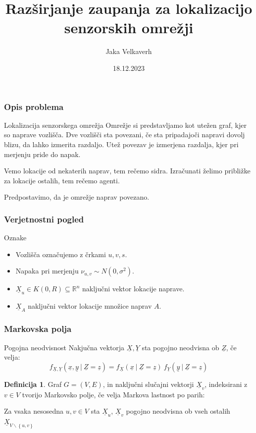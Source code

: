 \documentclass{beamer}
\title[Razširjanje zaupanja]{Razširjanje zaupanja za lokalizacijo senzorskih omrežji}
\author{Jaka Velkaverh}
\date{18.12.2023}
\theoremstyle{definition}
\newtheorem{definicija}{Definicija}
\begin{document}
	\frame{\titlepage}

	\begin{frame}
		\frametitle{Opis problema}
		\begin{block}{Lokalizacija senzorskega omrežja}
			Omrežje si predstavljamo kot utežen graf, kjer so naprave vozlišča.
			Dve vozlišči sta povezani, če sta pripadajoči napravi dovolj blizu,
			da lahko izmerita razdaljo. Utež povezav je izmerjena razdalja,
			kjer pri merjenju pride do napak.

			Vemo lokacije od nekaterih naprav, tem rečemo sidra. Izračunati
			želimo približke za lokacije ostalih, tem rečemo agenti.
		\end{block}
		Predpostavimo, da je omrežje naprav povezano.
	\end{frame}

	\begin{frame}
		\frametitle{Verjetnostni pogled}
		Oznake
		\begin{itemize}
			\item Vozlišča označujemo z črkami $u, v, s$.
			\item Napaka pri merjenju $\nu_{u, v} \sim N\left(0, \sigma^2\right)$.
			\item $\underline{X}_u \in K\left(0,R\right) \subseteq \mathbb{R}^n$ naključni vektor lokacije naprave.
			\item $\underline{X}_A$ naključni vektor lokacije množice naprav $A$.
		\end{itemize}
	\end{frame}

	\begin{frame}
		\frametitle{Markovska polja}
		\begin{block}{Pogojna neodvisnost}
			Nakjučna vektorja $\underline{X}, \underline{Y}$ sta pogojno
			neodvisna ob $\underline{Z}$, če velja:
			$$f_{\underline{X}, \underline{Y}}\left(\underline{x}, \underline{y}\ |\ \underline{Z} = \underline{z}\right) =
			  f_{\underline{X}}\left(\underline{x}\ |\ \underline{Z} = \underline{z}\right) \
			  f_{\underline{Y}}\left(\underline{y}\ |\ \underline{Z} = \underline{z}\right)
			$$
		\end{block}
		\pause
		\begin{definicija}
			Graf $G = \left(V, E\right)$, in naključni slučajni vektorji
			$\underline{X}_v$, indeksirani z $v \in V$ tvorijo Markovsko polje,
			če velja Markova lastnost po parih:

			Za vsaka nesosedna $u, v \in V$ sta $\underline{X}_u$, $\underline{X}_v$
			pogojno neodvisna ob vseh ostalih
			$\underline{X}_{V\backslash\left\{u, v\right\}}$
		\end{definicija}
	\end{frame}
\end{document}
